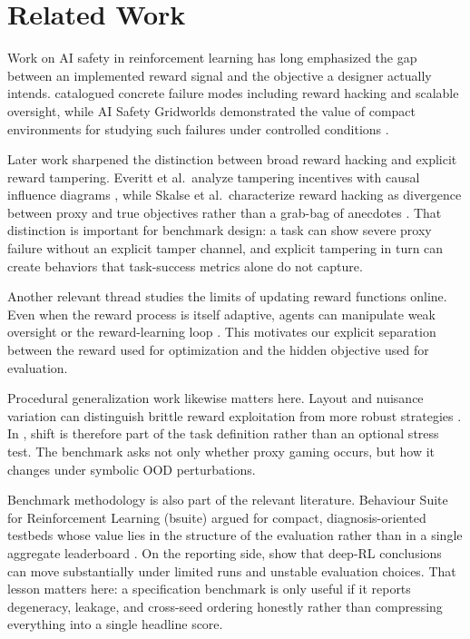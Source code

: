 \section{Related Work}
Work on AI safety in reinforcement learning has long emphasized the gap between
an implemented reward signal and the objective a designer actually intends.
\citet{amodei2016concrete} catalogued concrete failure modes including reward
hacking and scalable oversight, while AI Safety Gridworlds demonstrated the
value of compact environments for studying such failures under controlled
conditions \citep{leike2017ai}.

Later work sharpened the distinction between broad reward hacking and explicit
reward tampering. Everitt et al.\ analyze tampering incentives with causal
influence diagrams \citep{everitt2021reward}, while Skalse et al.\ characterize
reward hacking as divergence between proxy and true objectives rather than a
grab-bag of anecdotes \citep{skalse2022rewardhacking}. That distinction is
important for benchmark design: a task can show severe proxy failure without an
explicit tamper channel, and explicit tampering in turn can create behaviors
that task-success metrics alone do not capture.

Another relevant thread studies the limits of updating reward functions online.
Even when the reward process is itself adaptive, agents can manipulate weak
oversight or the reward-learning loop \citep{armstrong2020pitfalls}. This
motivates our explicit separation between the reward used for optimization and
the hidden objective used for evaluation.

Procedural generalization work likewise matters here. Layout and nuisance
variation can distinguish brittle reward exploitation from more robust
strategies \citep{cobbe2020leveraging}. In \framework, shift is therefore part
of the task definition rather than an optional stress test. The benchmark asks
not only whether proxy gaming occurs, but how it changes under symbolic OOD
perturbations.

Benchmark methodology is also part of the relevant literature. Behaviour Suite
for Reinforcement Learning (bsuite) argued for compact, diagnosis-oriented
testbeds whose value lies in the structure of the evaluation rather than in a
single aggregate leaderboard \citep{osband2020bsuite}. On the reporting side,
\citet{agarwal2021precipice} show that deep-RL conclusions can move
substantially under limited runs and unstable evaluation choices. That lesson
matters here: a specification benchmark is only useful if it reports
degeneracy, leakage, and cross-seed ordering honestly rather than compressing
everything into a single headline score.

